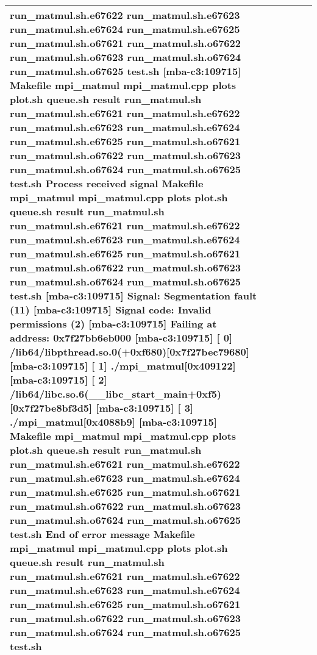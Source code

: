 \documentclass{article}
\begin{document}
\begin{tabular} { | l | l | l | l | l | l | }
run_matmul.sh.e67622 run_matmul.sh.e67623 run_matmul.sh.e67624 run_matmul.sh.e67625 run_matmul.sh.o67621 run_matmul.sh.o67622 run_matmul.sh.o67623 run_matmul.sh.o67624 run_matmul.sh.o67625 test.sh [mba-c3:109715] Makefile mpi_matmul mpi_matmul.cpp plots plot.sh queue.sh result run_matmul.sh run_matmul.sh.e67621 run_matmul.sh.e67622 run_matmul.sh.e67623 run_matmul.sh.e67624 run_matmul.sh.e67625 run_matmul.sh.o67621 run_matmul.sh.o67622 run_matmul.sh.o67623 run_matmul.sh.o67624 run_matmul.sh.o67625 test.sh Process received signal Makefile mpi_matmul mpi_matmul.cpp plots plot.sh queue.sh result run_matmul.sh run_matmul.sh.e67621 run_matmul.sh.e67622 run_matmul.sh.e67623 run_matmul.sh.e67624 run_matmul.sh.e67625 run_matmul.sh.o67621 run_matmul.sh.o67622 run_matmul.sh.o67623 run_matmul.sh.o67624 run_matmul.sh.o67625 test.sh [mba-c3:109715] Signal: Segmentation fault (11) [mba-c3:109715] Signal code: Invalid permissions (2) [mba-c3:109715] Failing at address: 0x7f27bb6eb000 [mba-c3:109715] [ 0] /lib64/libpthread.so.0(+0xf680)[0x7f27bec79680] [mba-c3:109715] [ 1] ./mpi_matmul[0x409122] [mba-c3:109715] [ 2] /lib64/libc.so.6(__libc_start_main+0xf5)[0x7f27be8bf3d5] [mba-c3:109715] [ 3] ./mpi_matmul[0x4088b9] [mba-c3:109715] Makefile mpi_matmul mpi_matmul.cpp plots plot.sh queue.sh result run_matmul.sh run_matmul.sh.e67621 run_matmul.sh.e67622 run_matmul.sh.e67623 run_matmul.sh.e67624 run_matmul.sh.e67625 run_matmul.sh.o67621 run_matmul.sh.o67622 run_matmul.sh.o67623 run_matmul.sh.o67624 run_matmul.sh.o67625 test.sh End of error message Makefile mpi_matmul mpi_matmul.cpp plots plot.sh queue.sh result run_matmul.sh run_matmul.sh.e67621 run_matmul.sh.e67622 run_matmul.sh.e67623 run_matmul.sh.e67624 run_matmul.sh.e67625 run_matmul.sh.o67621 run_matmul.sh.o67622 run_matmul.sh.o67623 run_matmul.sh.o67624 run_matmul.sh.o67625 test.sh \\ \hline
\hline
\end{tabular}
\end{document}
